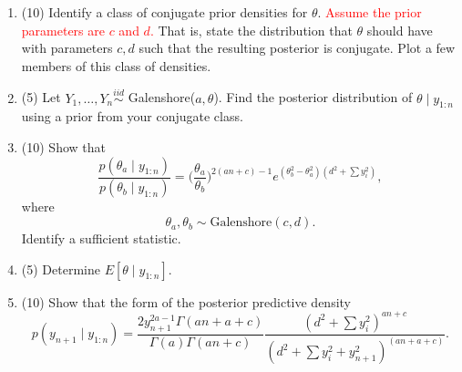 \documentclass{article}
\begin{document}
\begin{enumerate}
\begin{enumerate}
\item (10) Identify a class of conjugate prior densities for $\theta$. \textcolor{red}{Assume the prior parameters are $c$ and $d.$} That is, state the distribution that $\theta$ should have with parameters $c,d$ such that the resulting posterior is conjugate. Plot a few members of this class of densities.
\item (5) Let $Y_1, \ldots, Y_n \stackrel{iid}{\sim}$ Galenshore($a, \theta$). Find the posterior distribution of $\theta \mid y_{1:n}$ using a prior from your conjugate class. 
\item (10) Show that $$\frac{p(\theta_a \mid y_{1:n})}{p(\theta_b \mid y_{1:n})} = \bigg( \frac{\theta_a}{\theta_b} \bigg)^{2(an + c) - 1}
e^{(\theta_b^2 - \theta_a^2)(d^2 + \sum y_i^2)},$$ where $$\theta_a, \theta_b \sim \text{Galenshore}(c,d).$$ Identify a sufficient statistic. 
\item (5) Determine $E[\theta \mid y_{1:n}]$.
\item (10) Show that the form of the posterior predictive density $$p(y_{n+1} \mid y_{1:n}) =  \frac{2 y_{n+1}^{2a - 1} \Gamma(an + a + c)}{\Gamma(a)\Gamma(an + c)}
\frac{(d^2 + \sum y_i^2)^{an + c}}{(d^2 + \sum y_i^2 + y_{n+1}^2)^{(an + a + c)}}.$$


\end{enumerate}

\end{enumerate}
\end{document}
